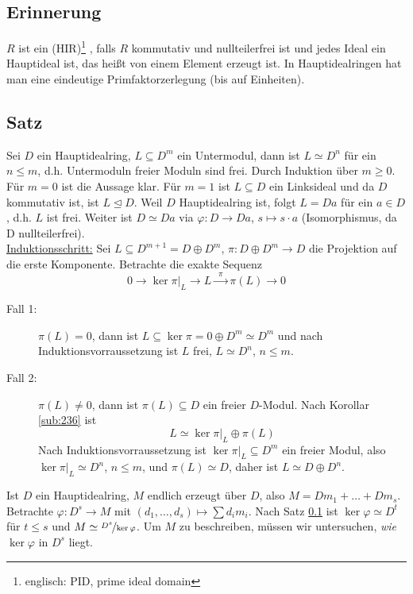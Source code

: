 \subsection*{Erinnerung} %
\label{sub:erinnerung_hir}
$R$ ist ein  (HIR)\footnote{englisch: PID, prime ideal domain} , falls $R$ kommutativ und nullteilerfrei ist und jedes Ideal ein Hauptideal ist, das 
heißt von einem Element erzeugt ist. In Hauptidealringen hat man eine eindeutige Primfaktorzerlegung (bis auf Einheiten).

\subsection[Satz: Für $R$ HIR sind Untermoduln freier $R$-Moduln frei]{Satz} %
\label{sub:242}
Sei $D$ ein Hauptidealring, $L \subseteq D^m$ ein Untermodul, dann ist $L \simeq D^n$ für ein $n \le m$, d.h. Untermoduln freier Moduln sind frei.
Durch Induktion über $m \ge 0$. Für $m=0$ ist die Aussage klar. Für $m=1$ ist $L \subseteq D$ ein Linksideal und da $D$ kommutativ ist, ist $L \unlhd D$. Weil $D$
Hauptidealring ist, folgt $L=D a$ für ein $a \in D$, d.h. $L$ ist frei. Weiter ist $D \simeq D a$ via $\varphi : D \to D a$, $s \mapsto s \cdot a$ (Isomorphismus, da D
nullteilerfrei). \\
\uline{Induktionsschritt:} Sei $L \subseteq D^{m+1} = D \oplus D^m$, $\pi  : D \oplus D^m \to D$ die Projektion auf die erste Komponente. Betrachte die exakte Sequenz
\[
	0 \longrightarrow \ker \pi\big|_L \longrightarrow L \xrightarrow{\enspace \pi \enspace} \pi(L) \longrightarrow 0 
\]
\begin{description}
	\item[Fall 1:] $\pi (L)=0$, dann ist $L \subseteq \ker \pi = 0 \oplus D^m \simeq D^m$ und nach Induktionsvorraussetzung ist $L$ frei, $L \simeq D^n$, $n \le m$.
	\item[Fall 2:] $\pi (L) \not= 0$, dann ist $\pi(L) \subseteq D$ ein freier $D$-Modul. Nach Korollar \ref{sub:236} ist 
	\[
		L \simeq \ker \pi\big|_L \oplus \pi(L)
	\]
	Nach Induktionsvorraussetzung ist $\ker \pi\big|_L \subseteq D^m$ ein freier Modul, also $\ker \pi\big|_L \simeq D^n$, $n \le m$, und $\pi (L) \simeq D$, daher ist 
	$L \simeq D \oplus D^n$. \bewende
\end{description}
	Ist $D$ ein Hauptidealring, $M$ endlich erzeugt über $D$, also $M = D m_1 + \ldots + D m_s$. Betrachte $\varphi : D^s \to M$ mit $(d_1, \ldots , d_s) \mapsto \sum d_i m_i$.
	Nach Satz \ref{sub:242} ist $\ker \varphi \simeq D^t$ für $t \le s$ und $M \simeq \nicefrac{D^s}{\ker \varphi}$. Um $M$ zu beschreiben, müssen wir untersuchen, 
	\emph{wie} $\ker \varphi$ in $D^s$ liegt.


